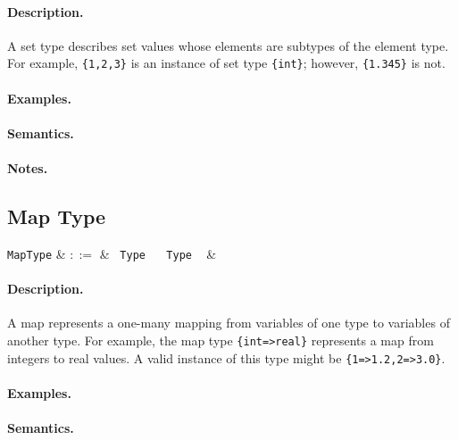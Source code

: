 \paragraph{Description.}  A set type describes set values whose
elements are subtypes of the element type. For example,
\lstinline|{1,2,3}| is an instance of set type \lstinline|{int}|;
however, \lstinline|{1.345}| is not.

\paragraph{Examples.}

\paragraph{Semantics.}

\paragraph{Notes.} 


\subsection{Map Type}

\begin{syntax}
  \verb+MapType+ & $::=$ & \token{\{} \ \verb+Type+ \ \token{=>} \ \verb+Type+ \ \token{\}} &\\
\end{syntax}

\paragraph{Description.}  A map represents a one-many mapping from
variables of one type to variables of another type. For example, the
map type \lstinline|{int=>real}| represents a map from integers to real
values. A valid instance of this type might be \lstinline|{1=>1.2,2=>3.0}|.

\paragraph{Examples.}

\paragraph{Semantics.}

